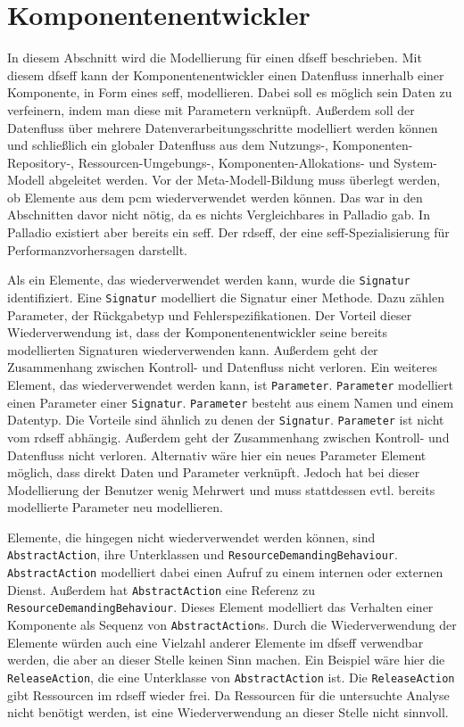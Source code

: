\section{Komponentenentwickler}
\label{sec:paket:dfseff}
In diesem Abschnitt wird die Modellierung für einen \gls{dfseff} beschrieben. Mit diesem \gls{dfseff} kann der Komponentenentwickler einen Datenfluss innerhalb einer Komponente, in Form eines \gls{seff}, modellieren. Dabei soll es möglich sein Daten zu verfeinern, indem man diese mit Parametern verknüpft. Außerdem soll der Datenfluss über mehrere Datenverarbeitungsschritte modelliert werden können und schließlich ein globaler Datenfluss aus dem Nutzungs-, Komponenten-Repository-, Ressourcen-Umgebungs-, Komponenten-Allokations- und System-Modell abgeleitet werden. Vor der Meta-Modell-Bildung muss überlegt werden, ob Elemente aus dem \gls{pcm} wiederverwendet werden können. Das war in den Abschnitten davor nicht nötig, da es nichts Vergleichbares in Palladio gab. In Palladio existiert aber bereits ein \gls{seff}. Der \gls{rdseff}, der eine \gls{seff}-Spezialisierung für Performanzvorhersagen darstellt. \par 
Als ein Elemente, das wiederverwendet werden kann, wurde die \texttt{Signatur} identifiziert. Eine \texttt{Signatur} modelliert die Signatur einer Methode. Dazu zählen Parameter, der Rückgabetyp und Fehlerspezifikationen. Der Vorteil dieser Wiederverwendung ist, dass der Komponentenentwickler seine bereits modellierten Signaturen wiederverwenden kann. Außerdem geht der Zusammenhang zwischen Kontroll- und Datenfluss nicht verloren. Ein weiteres Element, das wiederverwendet werden kann, ist \texttt{Parameter}. \texttt{Parameter} modelliert einen Parameter einer \texttt{Signatur}. \texttt{Parameter} besteht aus einem Namen und einem Datentyp.  
Die Vorteile sind ähnlich zu denen der \texttt{Signatur}. \texttt{Parameter} ist nicht vom \gls{rdseff} abhängig. Außerdem geht der Zusammenhang zwischen Kontroll- und Datenfluss nicht verloren. Alternativ wäre hier ein neues Parameter Element möglich, dass direkt Daten und Parameter verknüpft. Jedoch hat bei dieser Modellierung der Benutzer wenig Mehrwert und muss stattdessen evtl. bereits modellierte Parameter neu modellieren. \par
Elemente, die hingegen nicht wiederverwendet werden können, sind \texttt{AbstractAction}, ihre Unterklassen und \texttt{ResourceDemandingBehaviour}. \texttt{AbstractAction} modelliert dabei einen Aufruf zu einem internen oder externen Dienst. Außerdem hat \texttt{AbstractAction} eine Referenz zu \texttt{ResourceDemandingBehaviour}. Dieses Element modelliert das Verhalten einer Komponente als Sequenz von \texttt{AbstractAction}s. Durch die Wiederverwendung der Elemente würden auch eine Vielzahl anderer Elemente im \gls{dfseff} verwendbar werden, die aber an dieser Stelle keinen Sinn machen. Ein Beispiel wäre hier die \texttt{ReleaseAction}, die eine Unterklasse von \texttt{AbstractAction} ist. Die \texttt{ReleaseAction} gibt Ressourcen im \gls{rdseff} wieder frei. Da Ressourcen für die untersuchte Analyse nicht benötigt werden, ist eine Wiederverwendung an dieser Stelle nicht sinnvoll. \par
